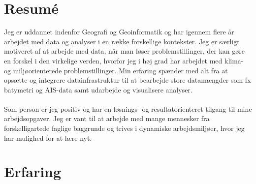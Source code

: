 \documentclass[11pt,a4paper,roman]{moderncv}        %
\begin{document}
\makecvtitle 
\vspace{-20pt}

\section{Resumé}
Jeg er uddannet indenfor Geografi og Geoinformatik og har igennem flere år arbejdet med data og analyser i en række forskellige kontekster. Jeg er særligt motiveret af at arbejde med data, når man løser problemstillinger, der kan gøre en forskel i den virkelige verden, hvorfor jeg i høj grad har arbejdet med klima- og miljøorienterede problemstillinger. Min erfaring spænder med alt fra at opsætte og integrere datainfrastruktur til at bearbejde store datamængder som fx batymetri og AIS-data samt udarbejde og visualisere analyser.
\\ \\
Som person er jeg positiv og har en løsnings- og resultatorienteret tilgang til mine arbejdsopgaver. Jeg er vant til at arbejde med mange mennesker fra forskelligartede faglige baggrunde og trives i dynamiske arbejdsmiljøer, hvor jeg har mulighed for at lære nyt. 

\section{Erfaring}

\vspace{4pt}
\end{document}
